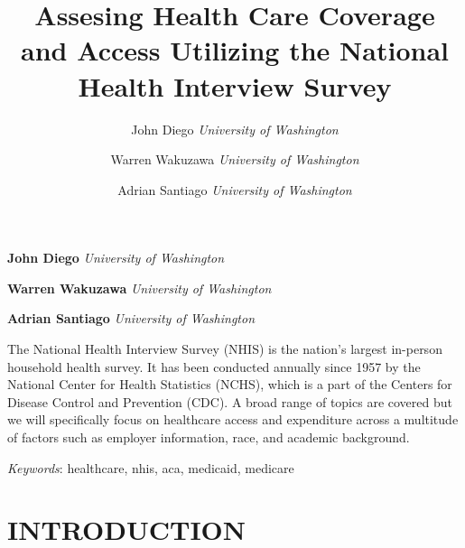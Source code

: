 \documentclass[10pt,]{article}
\title{Assesing Health Care Coverage and Access Utilizing the National Health
Interview Survey  }
\author{\Large John Diego\vspace{0.05in} \newline\normalsize\emph{University of Washington}   \and \Large Warren Wakuzawa\vspace{0.05in} \newline\normalsize\emph{University of Washington}   \and \Large Adrian Santiago\vspace{0.05in} \newline\normalsize\emph{University of Washington}  }
\date{}
\newcommand*{\authorfont}{\fontfamily{phv}\selectfont}
\renewenvironment{abstract}
 {{%
    \setlength{\leftmargin}{0mm}
    \setlength{\rightmargin}{\leftmargin}%
  }%
  \relax}
 {\endlist}
\begin{document}
	
%

{%
\setlength{\parindent}{0pt}
\thispagestyle{plain}
{\fontsize{18}{20}\selectfont\raggedright 
\maketitle  %

}

{
   \vskip 13.5pt\relax \normalsize\fontsize{11}{12} 
\textbf{\authorfont John Diego} \hskip 15pt \emph{\small University of Washington}   \par \textbf{\authorfont Warren Wakuzawa} \hskip 15pt \emph{\small University of Washington}   \par \textbf{\authorfont Adrian Santiago} \hskip 15pt \emph{\small University of Washington}   

}

}







\begin{abstract}

    \hbox{\vrule height .2pt width 39.14pc}

    \vskip 8.5pt %

\noindent The National Health Interview Survey (NHIS) is the nation's largest
in-person household health survey. It has been conducted annually since
1957 by the National Center for Health Statistics (NCHS), which is a
part of the Centers for Disease Control and Prevention (CDC). A broad
range of topics are covered but we will specifically focus on healthcare
access and expenditure across a multitude of factors such as employer
information, race, and academic background.


\vskip 8.5pt \noindent \emph{Keywords}: healthcare, nhis, aca, medicaid, medicare \par

    \hbox{\vrule height .2pt width 39.14pc}



\end{abstract}


\vskip 6.5pt

\noindent  \section{INTRODUCTION}\label{introduction}
\end{document}
